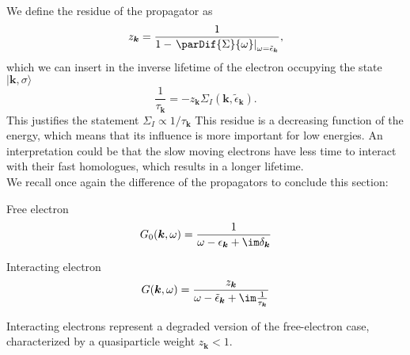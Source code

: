 \documentclass[../main.tex]{subfile}
\begin{document}
We define the residue of the propagator as 
\begin{equation}
    z_{\bm{k}} = \frac{1}{1- \left.\parDif{\Sigma}{\omega}\right|_{\omega = \tilde{\epsilon}_{\bm{k}}}}, \label{eq:residue}
\end{equation}
which we can insert in the inverse lifetime of the electron occupying the state $|\bm{k},\sigma\rangle$
\begin{equation*}
    \frac{1}{\tau_{\bm{k}}} = - z_{\bm{k}} \Sigma_I(\bm{k}, \tilde{\epsilon}_{\bm{k}}).
\end{equation*}
This justifies the statement $ \Sigma_I \propto 1/\tau_{\bm{k}}$
This residue is a decreasing function of the energy, which means that its influence is more important for low energies. 
An interpretation could be that the slow moving electrons have less time to interact with their fast homologues, which results in a
longer lifetime.\\

We recall once again the difference of the propagators to conclude this section:\vspace{12pt}\\
\begin{center}
\begin{minipage}{0.4\textwidth}
    \begin{center}
    Free electron
    \[G_0(\bm{k}, \omega) = \frac{1}{\omega- \epsilon_{\bm{k}}+\im \delta_{\bm{k}}}\]
\end{center}
\end{minipage}
\begin{minipage}{0.05\textwidth}
\end{minipage}
\begin{minipage}{0.4\textwidth}
    \begin{center}
        Interacting electron
    \[G(\bm{k}, \omega) = \frac{z_{\bm{k}}}{\omega- \tilde{\epsilon}_{\bm{k}}+\im \frac{1}{\tau_{\bm{k}}}}\]
    \end{center}
\end{minipage}
\end{center}

Interacting electrons represent a degraded version of the free-electron case, characterized by a quasiparticle weight $z_{\bm{k}} < 1$.\\
\end{document}
